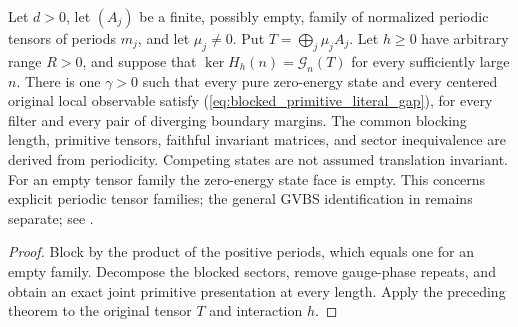 \begin{lemma}
    \label{thm:periodic_block_family_quasi_local_gap}
    \leanok
    Let $d>0$, let $(A_j)$ be a finite, possibly empty, family of normalized
    periodic tensors of periods $m_j$, and let $\mu_j\neq0$.
    Put $T=\bigoplus_j\mu_jA_j$. Let $h\geq0$ have arbitrary range $R>0$,
    and suppose that $\ker H_h(n)=\mathcal G_n(T)$ for every sufficiently
    large $n$. There is one $\gamma>0$ such that every pure zero-energy
    state and every centered original local observable satisfy
    (\ref{eq:blocked_primitive_literal_gap}), for every filter and every pair
    of diverging boundary margins. The common blocking length, primitive
    tensors, faithful invariant matrices, and sector inequivalence are
    derived from periodicity. Competing states are not assumed translation
    invariant. For an empty tensor family the zero-energy state face is empty.
    This concerns explicit periodic tensor families; the general GVBS
    identification in \cite[Theorem~1.2]{Nachtergaele1996Spectral}
    remains separate; see
    \cite{gap:nachtergaele96_infinite_volume_ground_projection}.
\end{lemma}
\begin{proof}\leanok
    Block by the product of the positive periods, which equals one for an
    empty family. Decompose the blocked sectors, remove gauge-phase repeats,
    and obtain an exact joint primitive presentation at every length.
    Apply the preceding theorem to the original tensor $T$ and interaction $h$.
\end{proof}

